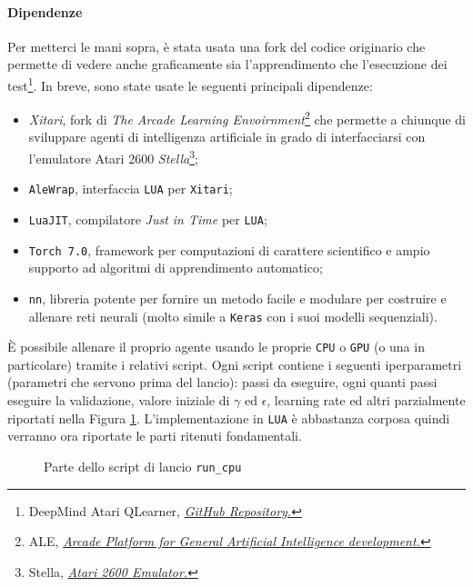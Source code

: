 \documentclass[twoside,twocolumn,10pt]{extarticle}
\theoremstyle{definition}
\begin{document}
		\paragraph*{Dipendenze} Per metterci le mani sopra, è stata usata una fork del codice originario che permette di vedere anche graficamente sia l'apprendimento che l'esecuzione dei test\footnote{DeepMind Atari Q\texttwelveudash Learner, \emph{\href{https://github.com/kuz/DeepMind-Atari-Deep-Q-Learner}{GitHub Repository.}}}. In breve, sono state usate le seguenti principali dipendenze:
		\begin{itemize}
			\item \textit{Xitari}, fork di \textit{The Arcade Learning Envoirnment}\footnote{ALE, \emph{\href{http://www.arcadelearningenvironment.org/}{Arcade Platform for General Artificial Intelligence development.}}} che permette a chiunque di sviluppare agenti di intelligenza artificiale in grado di interfacciarsi con l'emulatore Atari 2600 \textit{Stella}\footnote{Stella, \emph{\href{https://github.com/stella-emu/stella}{Atari 2600 Emulator.}}};
			\item \texttt{AleWrap}, interfaccia \texttt{LUA} per \texttt{Xitari};
			\item \texttt{LuaJIT}, compilatore \textit{Just in Time} per \texttt{LUA};
			\item \texttt{Torch 7.0}, framework per computazioni di carattere scientifico e ampio supporto ad algoritmi di apprendimento automatico;
			\item \texttt{nn}, libreria potente per fornire un metodo facile e modulare per costruire e allenare reti neurali (molto simile a \texttt{Keras} con i suoi modelli sequenziali).
		\end{itemize}
	
		È possibile allenare il proprio agente usando le proprie \texttt{CPU} o \texttt{GPU} (o una in particolare) tramite i relativi script. Ogni script contiene i seguenti iperparametri (parametri che servono prima del lancio): passi da eseguire, ogni quanti passi eseguire la validazione, valore iniziale di $\gamma$ ed $\epsilon$, learning rate ed altri parzialmente riportati nella Figura \ref{code:run}. L'implementazione in \texttt{LUA} è abbastanza corposa quindi verranno ora riportate le parti ritenuti fondamentali.
		\begin{figure}[ht!]
			\centering
			\caption{Parte dello script di lancio \texttt{run\_cpu}}
			
			\label{code:run}
		\end{figure}
	
\end{document}
